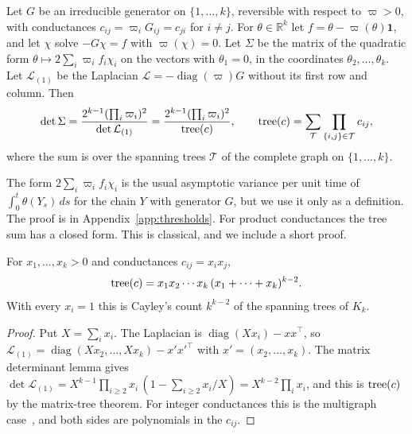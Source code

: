 \begin{lemma}\label{lem:occupation-covariance}
Let $G$ be an irreducible generator on $\{1,\ldots,k\}$, reversible with respect
to $\varpi>0$, with conductances $c_{ij}=\varpi_iG_{ij}=c_{ji}$ for $i\ne j$.
For $\theta\in\mathbb R^k$ let $f=\theta-\varpi(\theta)\mathbf1$, and let $\chi$
solve $-G\chi=f$ with $\varpi(\chi)=0$. Let $\Sigma$ be the matrix of the
quadratic form $\theta\mapsto2\sum_i\varpi_if_i\chi_i$ on the vectors with
$\theta_1=0$, in the coordinates $\theta_2,\ldots,\theta_k$. Let
$\mathcal L_{(1)}$ be the Laplacian $\mathcal L=-\operatorname{diag}(\varpi)G$
without its first row and column. Then
\[
\det\Sigma=\frac{2^{k-1}(\prod_i\varpi_i)^2}{\det\mathcal L_{(1)}}
=\frac{2^{k-1}(\prod_i\varpi_i)^2}{\operatorname{tree}(c)},\qquad
\operatorname{tree}(c)=\sum_{\mathcal T}\prod_{\{i,j\}\in\mathcal T}c_{ij},
\]
where the sum is over the spanning trees $\mathcal T$ of the complete graph on
$\{1,\ldots,k\}$.
\end{lemma}

The form $2\sum_i\varpi_if_i\chi_i$ is the usual asymptotic variance per unit
time of $\int_0^t\theta(Y_s)\,ds$ for the chain $Y$ with generator $G$, but we
use it only as a definition. The proof is in Appendix~\ref{app:thresholds}. For
product conductances the tree sum has a closed form. This is classical, and we
include a short proof.

\begin{lemma}\label{lem:weighted-cayley}
For $x_1,\ldots,x_k>0$ and conductances $c_{ij}=x_ix_j$,
\[
\operatorname{tree}(c)=x_1x_2\cdots x_k\,(x_1+\cdots+x_k)^{k-2}.
\]
With every $x_i=1$ this is Cayley's count $k^{k-2}$ of the spanning trees of
$K_k$.
\end{lemma}

\begin{proof}
Put $X=\sum_ix_i$. The Laplacian is $\operatorname{diag}(Xx_i)-xx^\top$, so
$\mathcal L_{(1)}=\operatorname{diag}(Xx_2,\ldots,Xx_k)-x'x'^\top$ with
$x'=(x_2,\ldots,x_k)$. The matrix determinant lemma gives
$\det\mathcal L_{(1)}=X^{k-1}\prod_{i\ge2}x_i\,(1-\sum_{i\ge2}x_i/X)
=X^{k-2}\prod_ix_i$, and this is $\operatorname{tree}(c)$ by the matrix-tree
theorem. For integer conductances this is the multigraph
case~\cite{bollobas1998}, and both sides are polynomials in the $c_{ij}$.
\end{proof}

